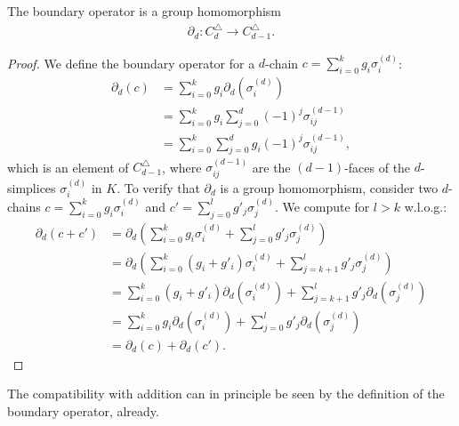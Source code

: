 \begin{lemma}
	The boundary operator is a group homomorphism
	\begin{align}
		\partial_d: C^{\triangle}_{d} \to C^{\triangle}_{d-1}. 
	\end{align}
\end{lemma}

\begin{proof}
	We define the boundary operator for a \( d \)-chain \( c = \sum_{i=0}^{k} g_{i} \sigma_{i}^{(d)} \):
	\begin{align}
		\partial_d(c) & = \sum_{i=0}^{k} g_{i} \partial_d(\sigma_{i}^{(d)}) \nonumber \\
		            & = \sum_{i=0}^{k} g_{i} \sum_{j=0}^{d} (-1)^{j} \sigma_{ij}^{(d-1)} \nonumber \\
		            & = \sum_{i=0}^{k} \sum_{j=0}^{d} g_{i} (-1)^{j} \sigma_{ij}^{(d-1)}, 
	\end{align}
	which is an element of \( C^{\triangle}_{d-1} \), where \( \sigma_{ij}^{(d-1)} \) are the \( (d-1) \)-faces of the \( d \)-simplices \( \sigma_{i}^{(d)} \) in \( K \). To verify that \( \partial_d \) is a group homomorphism, consider two \( d \)-chains \( c = \sum_{i=0}^{k} g_{i} \sigma_{i}^{(d)} \) and \( c' = \sum_{j=0}^{l} g'_{j} \sigma_{j}^{(d)} \). We compute for $l > k$ w.l.o.g.:
	\begin{align}
		\partial_d(c + c') & = \partial_d( \sum_{i=0}^{k} g_{i} \sigma_{i}^{(d)} + \sum_{j=0}^{l} g'_{j} \sigma_{j}^{(d)} ) \nonumber\\
		                 & = \partial_d( \sum_{i=0}^{k} (g_{i} + g'_i) \sigma_{i}^{(d)} + \sum_{j=k+1}^{l} g'_{j} \sigma_{j}^{(d)} ) \nonumber\\
		                 & = \sum_{i=0}^{k} (g_{i}+g'_i) \partial_d(\sigma_{i}^{(d)}) + \sum_{j=k+1}^{l} g'_{j} \partial_d(\sigma_{j}^{(d)})    \nonumber\\
		                 & = \sum_{i=0}^{k} g_{i} \partial_d(\sigma_{i}^{(d)}) + \sum_{j=0}^{l} g'_{j} \partial_d(\sigma_{j}^{(d)}) \nonumber\\
		                 & = \partial_d(c) + \partial_d(c').                                                                           
	\end{align}
\end{proof}

\begin{remark}
The compatibility with addition can in principle be seen by the definition of the boundary operator, already.
\end{remark}

